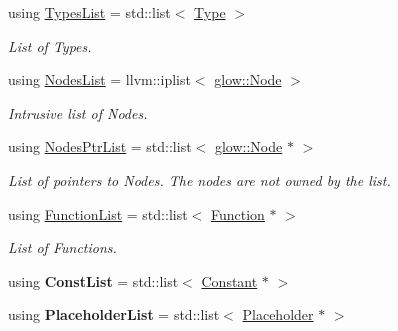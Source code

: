 \begin{DoxyCompactItemize}
using \hyperlink{namespaceglow_a4128b6e54c614a0a53265ffdce7073db}{Types\+List} = std\+::list$<$ \hyperlink{structglow_1_1_type}{Type} $>$
\begin{DoxyCompactList}\small\item\em List of Types. \end{DoxyCompactList}\item 
\mbox{\label{namespaceglow_a4919b7ef01548e927f0a5acb3a7400b9}} 
using \hyperlink{namespaceglow_a4919b7ef01548e927f0a5acb3a7400b9}{Nodes\+List} = llvm\+::iplist$<$ \hyperlink{classglow_1_1_node}{glow\+::\+Node} $>$
\begin{DoxyCompactList}\small\item\em Intrusive list of Nodes. \end{DoxyCompactList}\item 
\mbox{\label{namespaceglow_a40ec79a2f9c485bfa999ed31fd0854dd}} 
using \hyperlink{namespaceglow_a40ec79a2f9c485bfa999ed31fd0854dd}{Nodes\+Ptr\+List} = std\+::list$<$ \hyperlink{classglow_1_1_node}{glow\+::\+Node} $\ast$ $>$
\begin{DoxyCompactList}\small\item\em List of pointers to Nodes. The nodes are not owned by the list. \end{DoxyCompactList}\item 
\mbox{\label{namespaceglow_ae6f6f350877931e8074457bbab671b5f}} 
using \hyperlink{namespaceglow_ae6f6f350877931e8074457bbab671b5f}{Function\+List} = std\+::list$<$ \hyperlink{classglow_1_1_function}{Function} $\ast$ $>$
\begin{DoxyCompactList}\small\item\em List of Functions. \end{DoxyCompactList}\item 
\mbox{\label{namespaceglow_a72abfcd0a98a0493b2a86803a39331ae}} 
using {\bfseries Const\+List} = std\+::list$<$ \hyperlink{classglow_1_1_constant}{Constant} $\ast$ $>$
\item 
\mbox{\label{namespaceglow_a327eb2a1f49bd08fcbdd467b54f4f076}} 
using {\bfseries Placeholder\+List} = std\+::list$<$ \hyperlink{classglow_1_1_placeholder}{Placeholder} $\ast$ $>$
\item 
\mbox{\label{namespaceglow_a162f58aa7c2d2d5adeb5644d90763c00}} 

\end{DoxyCompactItemize}
